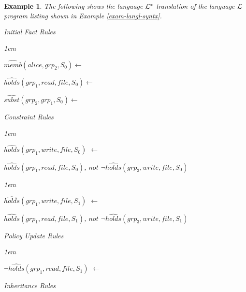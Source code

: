 \documentclass[11pt]{report}
\newtheorem{vexample}{Example}[chapter]
\newenvironment{vquote}
{
  \begin{list}{}{\leftmargin 1em}\item[]
}
{
  \end{list}
}
\begin{document}
        \begin{vexample}
          \label{exam-langl-seman}
          The following shows the language ${\cal L^{*}}$ translation of the
          language ${\cal L}$ program listing shown in Example
          \ref{exam-langl-syntx}.

          \begin{enumerate}
            \item
              Initial Fact Rules

              \begin{vquote}
                $\hat{memb}(alice, grp_2, S_{0}) \leftarrow$

                $\hat{holds}(grp_1, read, file,S_{0}) \leftarrow$

                $\hat{subst}(grp_2, grp_1, S_{0}) \leftarrow$
              \end{vquote}

            \item
              Constraint Rules

              \begin{vquote}
                $\hat{holds}(grp_1, write, file, S_{0})$ $\leftarrow$

                \hspace{1em}
                $\hat{holds}(grp_1, read, file, S_{0})$,
                $not$ $\lnot\hat{holds}(grp_3, write, file, S_{0})$
              \end{vquote}

              \begin{vquote}
                $\hat{holds}(grp_1, write, file, S_{1})$ $\leftarrow$

                \hspace{1em}
                $\hat{holds}(grp_1, read, file, S_{1})$,
                $not$ $\lnot\hat{holds}(grp_3, write, file, S_{1})$
              \end{vquote}

            \item
              Policy Update Rules

              \begin{vquote}
                $\lnot\hat{holds}(grp_1, read, file, S_{1})$ $\leftarrow$
              \end{vquote}
            \item
              Inheritance Rules


\end{enumerate}
\end{vexample}
\end{document}
